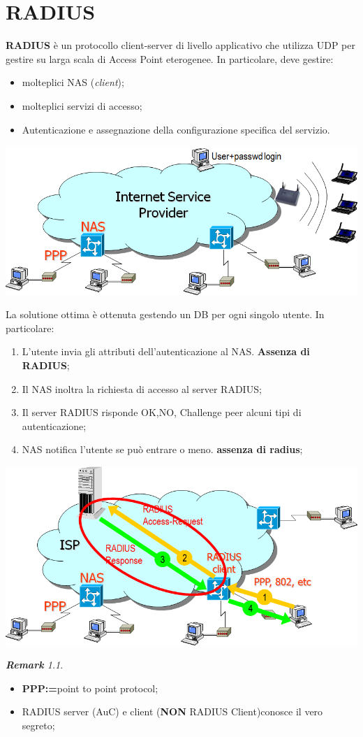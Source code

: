 \documentclass{book}
\theoremstyle{remark}
\newtheorem*{remark}{\textbf{Remark}}
\begin{document}
\chapter{RADIUS}
\textbf{RADIUS} è un protocollo client-server di livello applicativo che utilizza UDP per gestire su larga scala di Access Point eterogenee\@. In particolare, deve gestire:\begin{itemize}
	\item molteplici NAS (\emph{client});\@
	\item molteplici servizi di accesso;\@
	\item Autenticazione e assegnazione della configurazione specifica del servizio\@.
\end{itemize}
\begin{center}
	\includegraphics[scale=0.5]{Radius1.png}
\end{center}
La solutione ottima è ottenuta gestendo un DB per ogni singolo utente\@. In particolare:\begin{enumerate}
	\item L'utente invia gli attributi dell'autenticazione al NAS\@. \textbf{Assenza di RADIUS};\@
	\item Il NAS inoltra la richiesta di accesso al server RADIUS;\@
	\item Il server RADIUS risponde OK,NO, Challenge peer alcuni tipi di autenticazione;\@
	\item NAS notifica l'utente se può entrare o meno\@. \textbf{assenza di radius};\@
\end{enumerate}
\begin{center}
	\includegraphics[scale=0.5]{RADIUSW.png}
\end{center}
\begin{remark}
	\begin{itemize}
		\item \textbf{PPP:=}point to point protocol;\@
		\item RADIUS server (AuC) e client (\textbf{NON} RADIUS Client)conosce il vero segreto;\@
	\end{itemize}
\end{remark}
\end{document}
